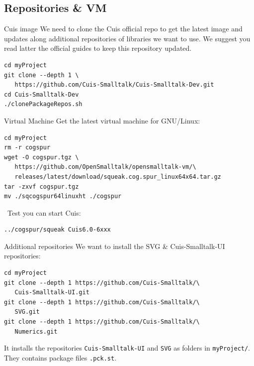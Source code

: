 \documentclass{beamer}
\newcommand{\tip}{\boldmath{\textcolor{red}{$\Rightarrow$}}}
\begin{document}
\subsection{Repositories \& VM}
\begin{frame}[fragile]{Cuis image}
  We need to clone the Cuis official repo to get the latest image and
  updates along additional repositories of libraries we want to
  use. We suggest you read latter the official guides to keep this
  repository updated\cite{cuisRepo}.

\begin{verbatim}
cd myProject
git clone --depth 1 \
   https://github.com/Cuis-Smalltalk/Cuis-Smalltalk-Dev.git
cd Cuis-Smalltalk-Dev
./clonePackageRepos.sh
\end{verbatim}
\end{frame}
%
\begin{frame}[fragile]{Virtual Machine}
  Get the latest virtual machine for GNU/Linux\cite{cuisRepo}:
\begin{verbatim}
cd myProject
rm -r cogspur
wget -O cogspur.tgz \
   https://github.com/OpenSmalltalk/opensmalltalk-vm/\
   releases/latest/download/squeak.cog.spur_linux64x64.tar.gz
tar -zxvf cogspur.tgz
mv ./sqcogspur64linuxht ./cogspur
\end{verbatim}
  
\tip\ Test you can start Cuis:
\begin{verbatim}
../cogspur/squeak Cuis6.0-6xxx
\end{verbatim}
\end{frame}
%
\begin{frame}[fragile]{Additional repositories}
  We want to install the SVG \& Cuis-Smalltalk-UI repositories:
\begin{verbatim}
cd myProject
git clone --depth 1 https://github.com/Cuis-Smalltalk/\
   Cuis-Smalltalk-UI.git
git clone --depth 1 https://github.com/Cuis-Smalltalk/\
   SVG.git
git clone --depth 1 https://github.com/Cuis-Smalltalk/\
   Numerics.git
\end{verbatim}

  It installs the repositories \texttt{Cuis-Smalltalk-UI} and
  \texttt{SVG} as folders in \texttt{myProject/}. They contains
  package files \texttt{.pck.st}.
  
\end{frame}
%
\end{document}
